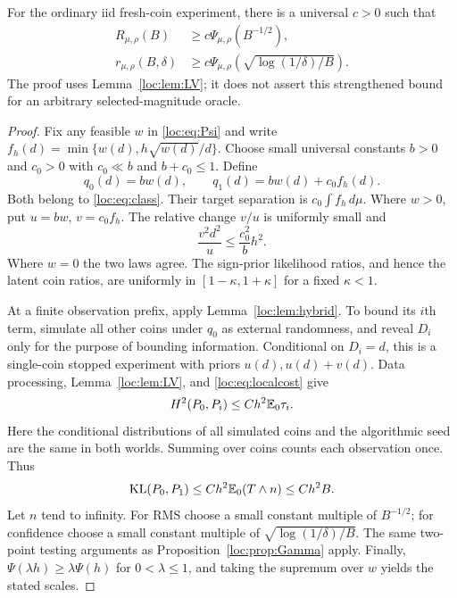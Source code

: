\begin{theorem}\label{loc:thm:PsiLower}
For the ordinary iid fresh-coin experiment, there is a universal $c>0$ such that
\begin{align}
 R_{\mu,\rho}(B)&\ge c\Psi_{\mu,\rho}(B^{-1/2}),\label{loc:eq:psilowr}\\
 r_{\mu,\rho}(B,\delta)&\ge c\Psi_{\mu,\rho}\left(\sqrt{\log(1/\delta)/B}\right).\label{loc:eq:psilowh}
\end{align}
The proof uses Lemma~\ref{loc:lem:LV}; it does not assert this strengthened bound for an arbitrary selected-magnitude oracle.
\end{theorem}
\begin{proof}
Fix any feasible $w$ in \eqref{loc:eq:Psi} and write $f_h(d)=\min\{w(d),h\sqrt{w(d)}/d\}$. Choose small universal constants $b>0$ and $c_0>0$ with $c_0\ll b$ and $b+c_0\le1$. Define
\[
 q_0(d)=bw(d),\qquad q_1(d)=bw(d)+c_0f_h(d).
\]
Both belong to \eqref{loc:eq:class}. Their target separation is $c_0\int f_h\,d\mu$.
Where $w>0$, put $u=bw$, $v=c_0f_h$. The relative change $v/u$ is uniformly small and
\begin{equation}\label{loc:eq:localcost}
 \frac{v^2d^2}{u}\le \frac{c_0^2}{b}h^2.
\end{equation}
Where $w=0$ the two laws agree. The sign-prior likelihood ratios, and hence the latent coin ratios, are uniformly in $[1-\kappa,1+\kappa]$ for a fixed $\kappa<1$.

At a finite observation prefix, apply Lemma~\ref{loc:lem:hybrid}. To bound its $i$th term, simulate all other coins under $q_0$ as external randomness, and reveal $D_i$ only for the purpose of bounding information. Conditional on $D_i=d$, this is a single-coin stopped experiment with priors $u(d),u(d)+v(d)$. Data processing, Lemma~\ref{loc:lem:LV}, and \eqref{loc:eq:localcost} give
\[
 H^2(P_0,P_i)\le C h^2\mathbb E_0\tau_i.
\]
Here the conditional distributions of all simulated coins and the algorithmic seed are the same in both worlds. Summing over coins counts each observation once. Thus
\[
 \operatorname{KL}(P_0,P_1)\le C h^2\mathbb E_0(T\wedge n)\le Ch^2B.
\]
Let $n$ tend to infinity. For RMS choose a small constant multiple of $B^{-1/2}$; for confidence choose a small constant multiple of $\sqrt{\log(1/\delta)/B}$. The same two-point testing arguments as Proposition~\ref{loc:prop:Gamma} apply. Finally, $\Psi(\lambda h)\ge\lambda\Psi(h)$ for $0<\lambda\le1$, and taking the supremum over $w$ yields the stated scales.
\end{proof}

